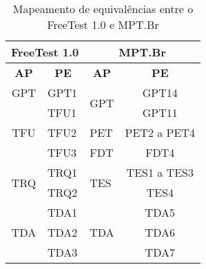 \begin{table}[!ht]
\centering
\caption{Mapeamento de equivalências entre o FreeTest 1.0 e MPT.Br}
\label{tab:4.1}
\begin{tabular}{|c|l|l|c|}
\hline
\multicolumn{2}{|c|}{\textbf{FreeTest 1.0}}             & \multicolumn{2}{c|}{\textbf{MPT.Br}}           \\ \hline
\textbf{AP}          & \multicolumn{1}{c|}{\textbf{PE}} & \multicolumn{1}{c|}{\textbf{AP}} & \textbf{PE} \\ \hline
GPT                  & GPT1                             & \multirow{2}{*}{GPT}             & GPT14       \\ \cline{1-2} \cline{4-4} 
\multirow{3}{*}{TFU} & TFU1                             &                                  & GPT11       \\ \cline{2-4} 
                     & TFU2                             & PET                              & PET2 a PET4 \\ \cline{2-4} 
                     & TFU3                             & FDT                              & FDT4        \\ \hline
\multirow{2}{*}{TRQ} & TRQ1                             & \multirow{2}{*}{TES}             & TES1 a TES3 \\ \cline{2-2} \cline{4-4} 
                     & TRQ2                             &                                  & TES4        \\ \hline
\multirow{3}{*}{TDA} & TDA1                             & \multirow{3}{*}{TDA}             & TDA5        \\ \cline{2-2} \cline{4-4} 
                     & TDA2                             &                                  & TDA6        \\ \cline{2-2} \cline{4-4} 
                     & TDA3                             &                                  & TDA7        \\ \hline
\end{tabular}
\end{table}


